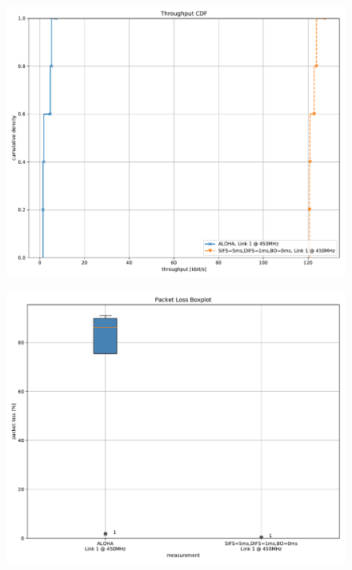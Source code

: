 \documentclass{article}
\begin{document}
\begin{figure}
	\includegraphics[width=\textwidth]{aloha_no_bo/cdf/throughput_cdf}
\end{figure}

\begin{figure}
	\includegraphics[width=\textwidth]{aloha_no_bo/boxplot/packet_loss_boxplot}
\end{figure}
\end{document}
